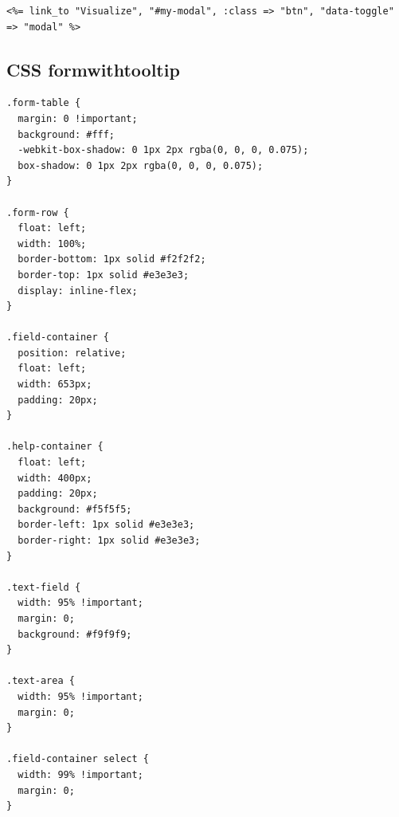 \begin{lstlisting}
<%= link_to "Visualize", "#my-modal", :class => "btn", "data-toggle" => "modal" %>
\end{lstlisting}

\subsection{CSS formwithtooltip}
\label{css-form}

\begin{lstlisting}
.form-table {
  margin: 0 !important;
  background: #fff;
  -webkit-box-shadow: 0 1px 2px rgba(0, 0, 0, 0.075);
  box-shadow: 0 1px 2px rgba(0, 0, 0, 0.075);
}

.form-row {
  float: left;
  width: 100%;
  border-bottom: 1px solid #f2f2f2;
  border-top: 1px solid #e3e3e3;
  display: inline-flex;
}

.field-container {
  position: relative;
  float: left;
  width: 653px;
  padding: 20px;
}

.help-container {
  float: left;
  width: 400px;
  padding: 20px;
  background: #f5f5f5;
  border-left: 1px solid #e3e3e3;
  border-right: 1px solid #e3e3e3;
}

.text-field {
  width: 95% !important;
  margin: 0;
  background: #f9f9f9;
}

.text-area {
  width: 95% !important;
  margin: 0;
}

.field-container select {
  width: 99% !important;
  margin: 0;
}
\end{lstlisting}
